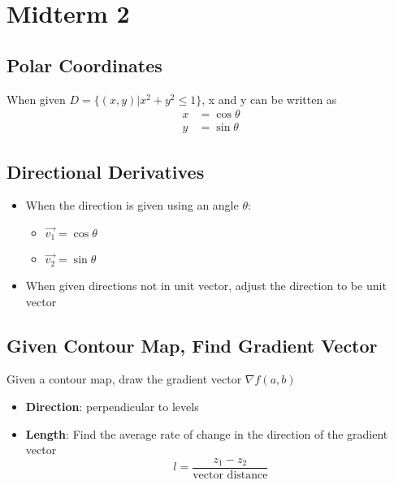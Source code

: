 \section{Midterm 2}

  \subsection{Polar Coordinates}

    When given $ D = \{ \left( x, y \right) | x^{2} + y^{2} \le 1 \} $,
    x and y can be written as
    \begin{align*}
      x &= \cos\theta \\
      y &= \sin\theta
    \end{align*}

  \subsection{Directional Derivatives}

    \begin{itemize}
      \item When the direction is given using an angle $ \theta $:
      \begin{itemize}
        \item $ \vec{v_{1}} = \cos\theta $
        \item $ \vec{v_{2}} = \sin\theta $
      \end{itemize}

      \item When given directions not in unit vector, adjust the direction
      to be unit vector
    \end{itemize}

  \subsection{Given Contour Map, Find Gradient Vector}

    Given a contour map, draw the gradient vector
    $ \nabla f\left( a, b \right) $

    \begin{itemize}
      \item \textbf{Direction}: perpendicular to levels
      \item \textbf{Length}: Find the average rate of change in the direction
      of the gradient vector
      \begin{displaymath}
        l = \frac{z_{1} - z_{2}}{\text{vector distance}}
      \end{displaymath}
    \end{itemize}


